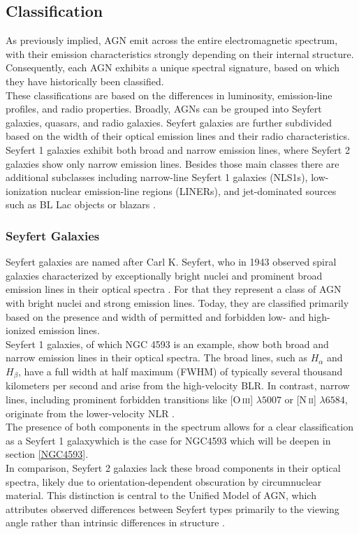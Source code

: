 \subsection{Classification}
\label{sec:classification}
As previously implied, AGN emit across the entire electromagnetic spectrum, with their emission characteristics strongly depending on their internal structure. Consequently, each AGN exhibits a unique spectral signature, based on which they have historically been classified.\\
These classifications are based on the differences in luminosity, emission-line profiles, and radio properties. Broadly, AGNs can be grouped into Seyfert galaxies, quasars, and radio galaxies. Seyfert galaxies are further subdivided based on the width of their optical emission lines and their radio characteristics. Seyfert 1 galaxies exhibit both broad and narrow emission lines, where Seyfert 2 galaxies show only narrow emission lines. Besides those main classes there are additional subclasses including narrow-line Seyfert 1 galaxies (NLS1s), low-ionization nuclear emission-line regions (LINERs), and jet-dominated sources such as BL Lac objects or blazars \parencite{antonucci1993unified, urry1995unified}.

\subsubsection{Seyfert Galaxies}

Seyfert galaxies are named after Carl K. Seyfert, who in 1943 observed spiral galaxies characterized by exceptionally bright nuclei and prominent broad emission lines in their optical spectra \parencite{seyfert1943nuclear}. For that they represent a class of AGN with bright nuclei and strong emission lines. Today, they are classified primarily based on the presence and width of permitted and forbidden low- and high-ionized emission lines.\\
Seyfert 1 galaxies, of which NGC 4593 is an example, show both broad and narrow emission lines in their optical spectra. The broad lines, such as $H_\alpha$ and $H_\beta$, have a full width at half maximum (FWHM) of typically several thousand kilometers per second and arise from the high-velocity BLR. In contrast, narrow lines, including prominent forbidden transitions like [O\,\textsc{iii}] $\lambda5007$ or [N\,\textsc{ii}] $\lambda6584$, originate from the lower-velocity NLR \parencite{osterbrock1989agn, peterson1997introduction}.\\
The presence of both components in the spectrum allows for a clear classification as a Seyfert 1 galaxywhich is the case for NGC4593 which will be deepen in section \ref{NGC4593}.\\
In comparison, Seyfert 2 galaxies lack these broad components in their optical spectra, likely due to orientation-dependent obscuration by circumnuclear material. This distinction is central to the Unified Model of AGN, which attributes observed differences between Seyfert types primarily to the viewing angle rather than intrinsic differences in structure \parencite{antonucci1993unified, urry1995unified}.



